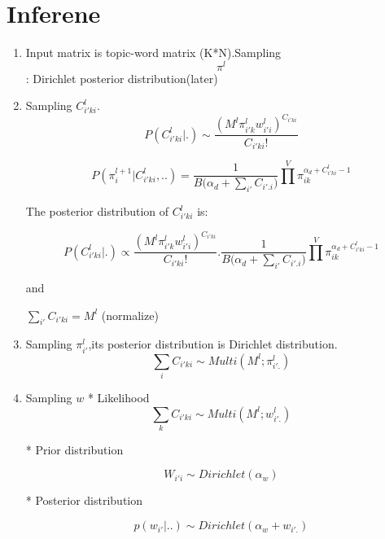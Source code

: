 \section{Inferene}
\begin{enumerate}
  \item Input matrix is topic-word matrix (K*N).Sampling $$\pi^{l}$$: Dirichlet posterior distribution(later)

  \item Sampling $C_{i'ki}^l$.
  $$P(C_{i'ki}^{l}|.) \sim \frac{(M^l \pi_{i'k}^l w_{i'i}^l)^{C_{i'ki}}}{C_{i'ki}!}$$

  $$P(\pi_i^{l+1}|C_{i'ki}^{l},..) = \frac{1}{B({\alpha_d +\sum_{i'}{C_{i'.i})}}} \prod^V \pi_{ik}^{\alpha_d+C_{i'ki}^l-1}$$

  The posterior distribution of $C_{i'ki}^{l}$ is:

  $$P(C_{i'ki}^{l}|.) \propto \frac{(M^l \pi_{i'k}^l w_{i'i}^l)^{C_{i'ki}}}{C_{i'ki}!} .\frac{1}{B({\alpha_d +\sum_{i'}{C_{i'.i})}}} \prod^V \pi_{ik}^{\alpha_d+C_{i'ki}^l-1} $$

  and

  $\sum_{i'}{C_{i'ki}} = M^l$  (normalize)

  \item Sampling $\pi_{i'}^l$,its posterior distribution is Dirichlet distribution.
  $$\sum_i{C_{i'ki}} \sim Multi(M^l;\pi_{i'.}^l)$$

  \item  Sampling $w$
  * Likelihood
  $$\sum_k{C_{i'ki}} \sim Multi(M^l;w_{i'.}^l)$$

  * Prior distribution

  $$W_{i'i} \sim Dirichlet(\alpha_w)$$

  * Posterior distribution

  $$p(w_{i'}|..) \sim Dirichlet(\alpha_w+w_{i'.})$$
\end{enumerate}
